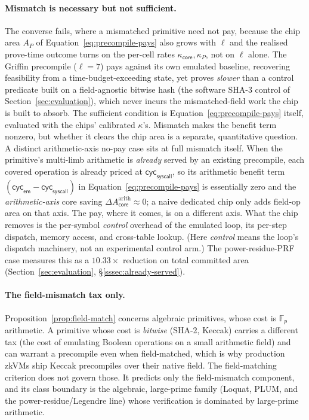 \paragraph{Mismatch is necessary but not sufficient.} The converse fails, where a mismatched primitive need not pay, because the chip area $A_P$ of Equation~\eqref{eq:precompile-pays} also grows with $\ell$ and the realised prove-time outcome turns on the per-cell rates $\kappa_{\mathsf{core}},\kappa_P$, not on $\ell$ alone. The Griffin precompile ($\ell=7$) pays against its own emulated baseline, recovering feasibility from a time-budget-exceeding state, yet proves \emph{slower} than a control predicate built on a field-agnostic bitwise hash (the software SHA-3 control of Section~\ref{sec:evaluation}), which never incurs the mismatched-field work the chip is built to absorb. The sufficient condition is Equation~\eqref{eq:precompile-pays} itself, evaluated with the chips' calibrated $\kappa$'s. Mismatch makes the benefit term nonzero, but whether it clears the chip area is a separate, quantitative question. A distinct arithmetic-axis no-pay case sits at full mismatch itself. When the primitive's multi-limb arithmetic is \emph{already} served by an existing precompile, each covered operation is already priced at $\mathsf{cyc}_{\mathsf{syscall}}$, so its arithmetic benefit term $(\mathsf{cyc}_{\mathsf{em}}-\mathsf{cyc}_{\mathsf{syscall}})$ in Equation~\eqref{eq:precompile-pays} is essentially zero and the \emph{arithmetic-axis} core saving $\Delta A_{\mathsf{core}}^{\mathrm{arith}}\approx 0$; a naive dedicated chip only adds field-op area on that axis. The pay, where it comes, is on a different axis. What the chip removes is the per-symbol \emph{control} overhead of the emulated loop, its per-step dispatch, memory access, and cross-table lookup. (Here \emph{control} means the loop's dispatch machinery, not an experimental control arm.) The power-residue-PRF case measures this as a $10.33\times$ reduction on total committed area (Section~\ref{sec:evaluation}, \S\ref{sssec:already-served}).

\paragraph{The field-mismatch tax only.} Proposition~\ref{prop:field-match} concerns algebraic primitives, whose cost is $\mathbb{F}_p$ arithmetic. A primitive whose cost is \emph{bitwise} (SHA-2, Keccak) carries a different tax (the cost of emulating Boolean operations on a small arithmetic field) and can warrant a precompile even when field-matched, which is why production zkVMs ship Keccak precompiles over their native field. The field-matching criterion does not govern those. It predicts only the field-mismatch component, and its class boundary is the algebraic, large-prime family (Loquat, PLUM, and the power-residue/Legendre line) whose verification is dominated by large-prime arithmetic.

